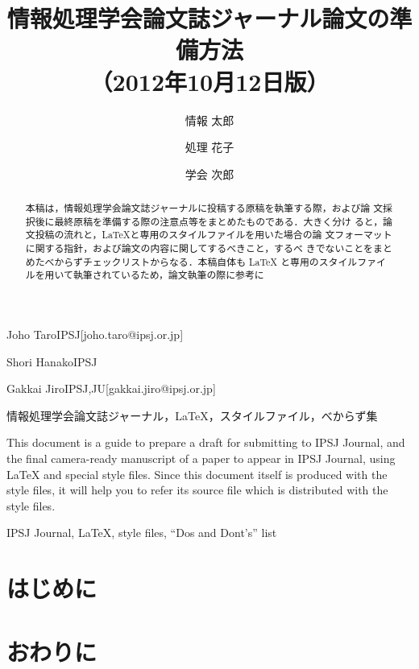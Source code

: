 \documentclass[submit,techrep]{ipsj}
\begin{document}
\title{情報処理学会論文誌ジャーナル論文の準備方法\\（2012年10月12日版）}
\author{情報 太郎}{Joho Taro}{IPSJ}[joho.taro@ipsj.or.jp]
\author{処理 花子}{Shori Hanako}{IPSJ}
\author{学会 次郎}{Gakkai Jiro}{IPSJ,JU}[gakkai.jiro@ipsj.or.jp]
\begin{abstract}
本稿は，情報処理学会論文誌ジャーナルに投稿する原稿を執筆する際，および論
文採択後に最終原稿を準備する際の注意点等をまとめたものである．大きく分け
ると，論文投稿の流れと，\LaTeX と専用のスタイルファイルを用いた場合の論
文フォーマットに関する指針，および論文の内容に関してするべきこと，するべ
きでないことをまとめたべからずチェックリストからなる．本稿自体も \LaTeX
と専用のスタイルファイルを用いて執筆されているため，論文執筆の際に参考に
\end{abstract}
\begin{jkeyword}
情報処理学会論文誌ジャーナル，\LaTeX，スタイルファイル，べからず集
\end{jkeyword}
\begin{eabstract}
This document is a guide to prepare a draft for submitting to IPSJ
Journal, and the final camera-ready manuscript of a paper to appear in
IPSJ Journal, using {\LaTeX} and special style files.  Since this
document itself is produced with the style files, it will help you to
refer its source file which is distributed with the style files.
\end{eabstract}
\begin{ekeyword}
IPSJ Journal, \LaTeX, style files, ``Dos and Dont's'' list
\end{ekeyword}
\maketitle
\section{はじめに}
\cite{latex}
\section{おわりに}
\begin{acknowledgment}
\end{acknowledgment}


\appendix
\end{document}
